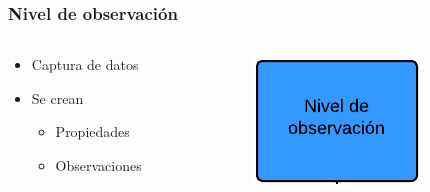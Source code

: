 \begin{frame}
	\frametitle{Nivel de observaci\'on}
	
	\begin{columns}[T] %
		\begin{column}[T]{5cm} %
			\begin{itemize}
				\item Captura de datos
				\item Se crean
				\begin{itemize}
					\item Propiedades
					\item Observaciones
				\end{itemize}
			\end{itemize}
		\end{column}
		\begin{column}[T]{5cm} %
			\includegraphics[width=0.5\linewidth]{./Figures/NivelDeObservacion.png}
		\end{column}
	\end{columns}
\end{frame}